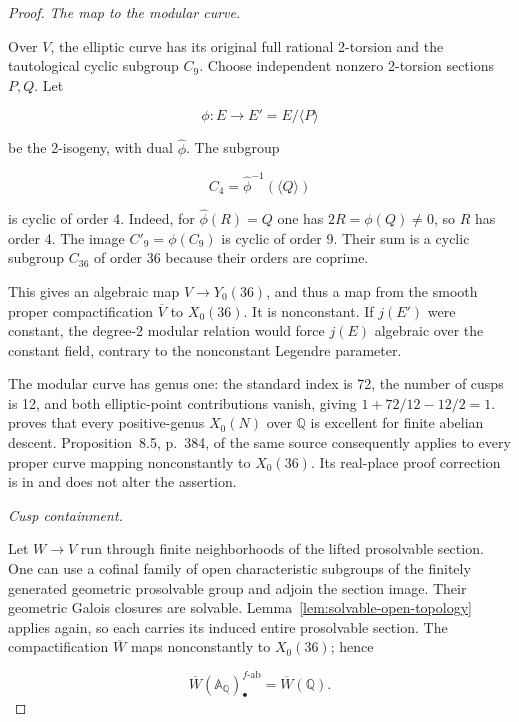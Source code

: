 \begin{proof}
\par\medskip\noindent\textit{The map to the modular curve.}\quad 

Over \(V\), the elliptic curve has its original full rational 2-torsion
and the tautological cyclic subgroup \(C_9\). Choose independent nonzero
2-torsion sections \(P,Q\). Let

\[
\phi:E\longrightarrow E'=E/\langle P\rangle
\]

be the 2-isogeny, with dual \(\widehat\phi\). The subgroup

\[
C_4=\widehat\phi^{-1}(\langle Q\rangle)
\]

is cyclic of order 4. Indeed, for \(\widehat\phi(R)=Q\) one has
\(2R=\phi(Q)\ne0\), so \(R\) has order 4. The image \(C'_9=\phi(C_9)\)
is cyclic of order 9. Their sum is a cyclic subgroup \(C_{36}\) of order
36 because their orders are coprime.

This gives an algebraic map \(V\to Y_0(36)\), and thus a map from the
smooth proper compactification \(\overline V\) to \(X_0(36)\). It is
nonconstant. If \(j(E')\) were constant, the degree-2 modular relation
would force \(j(E)\) algebraic over the constant field, contrary to the
nonconstant Legendre parameter.

The modular curve has genus one: the standard index is 72, the number of
cusps is 12, and both elliptic-point contributions vanish, giving
\(1+72/12-12/2=1\). \citet[Corollary~8.8, p.~385]{Stoll2007} proves
that every positive-genus \(X_0(N)\) over \(\mathbb Q\) is excellent for
finite abelian descent. Proposition~8.5, p.~384, of the same source consequently
applies to every proper curve mapping nonconstantly to \(X_0(36)\). Its
real-place proof correction is in \citet[\S3]{StollErrata2017} and does not
alter the assertion.

\par\medskip\noindent\textit{Cusp containment.}\quad 

Let \(W\to V\) run through finite neighborhoods of the lifted
prosolvable section. One can use a cofinal family of open characteristic
subgroups of the finitely generated geometric prosolvable group and
adjoin the section image. Their geometric Galois closures are solvable.
Lemma~\ref{lem:solvable-open-topology} applies again, so each carries its induced entire prosolvable
section. The compactification \(\overline W\) maps nonconstantly to
\(X_0(36)\); hence

\[
\overline W(\mathbb A_{\mathbb Q})_\bullet^{f\text{-ab}}
=\overline W(\mathbb Q).
\]


\end{proof}
